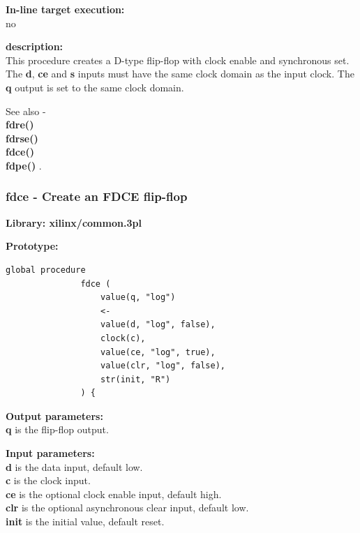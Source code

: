            {\bf In-line target execution:} \\
            no

            {\bf description:} \\
            This procedure creates a D-type flip-flop with clock enable and
            synchronous set. The {\bf d}, {\bf ce} and {\bf s} inputs must have
            the same clock domain as the input clock. The {\bf q} output is set
            to the same clock domain.
            
            See also - \\
            {\bf fdre()} \\
            {\bf fdrse()} \\
            {\bf fdce()} \\
            {\bf fdpe()} .


        \subsubsection{fdce - Create an FDCE flip-flop}\label{sec:lpfdce}
            
            {\bf Library: xilinx/common.3pl}

            {\bf Prototype:} \\
            \vsp
            \begin{lstlisting}[gobble=12, language=threepl]
               global procedure
               fdce (
                   value(q, "log")
                   <-
                   value(d, "log", false),
                   clock(c),
                   value(ce, "log", true),
                   value(clr, "log", false),
                   str(init, "R")
               ) {
            \end{lstlisting}

            {\bf Output parameters:} \\
            {\bf q} is the flip-flop output.

            {\bf Input parameters:} \\            
            {\bf d} is the data input, default low.\\
            {\bf c} is the clock input.\\
            {\bf ce} is the optional clock enable input, default high.\\
            {\bf clr} is the optional asynchronous clear input, default low. \\
            {\bf init} is the initial value, default reset.
        

